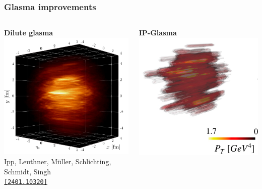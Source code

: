\documentclass[aspectratio=169,11pt,usenames,dvipsnames]{beamer}
\begin{document}
\begin{frame}[noframenumbering]
    \frametitle{Glasma improvements}
    {\vspace{-15pt}
    \begin{columns}[onlytextwidth,c]
            \begin{center}
                {\scriptsize\bfseries Dilute glasma}
                \\[1pt]
                \includegraphics[width=0.6\columnwidth]{images/glasma_tau_0.4_paper.png}
                \\[-4pt]
                {\tiny Ipp, Leuthner, Müller, Schlichting, Schmidt, Singh} \\ \tiny \href{https://arxiv.org/abs/2401.10320}{\color{jyured}\texttt{[2401.10320]}\scalebox{.6}{$^\text{\tiny\faExternalLink}$}}
            \end{center}
            \begin{center}
                {\scriptsize\bfseries IP-Glasma}
                \\[1pt]
                \includegraphics[width=0.6\columnwidth]{images/evolution.png}

\end{center}
\end{columns}}
\end{frame}
\end{document}

